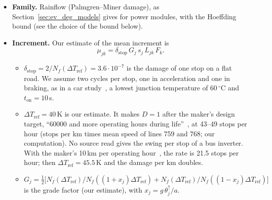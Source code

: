 \documentclass[11pt,a4paper]{article}
\theoremstyle{plain}
\theoremstyle{definition}
\theoremstyle{remark}
\begin{document}
\begin{itemize}
    With a Weibull shape~$k$ of module life, a module fails before $D$ reaches~$\tau$ with probability $1 - \exp(-\ln(1/0.85)\,\tau^k)$.
    Setting this probability to 1\% gives (our derivation)
    \begin{equation}\label{eq:cs_inv_tau}
      \tau = \bigl(\ln 0.99/\ln 0.85\bigr)^{1/k},
    \end{equation}
    that is $\tau = 0.573$ for $k = 5$ and $\tau = 0.814$ for $k = 13.5$.
    Shapes from 13.5 to 24 fit one industrial module at a swing of 81\,K (our computation from~\cite[Table~IV]{Choi2017}); $k \approx 4$--$5$ is our reading of the spread of the maker's tests at 30\,K~\cite[Fig.~3]{Wintrich2024}.
    This is the $\varepsilon$-splitting of Remark~\ref{rem:miner_dichotomy} with $\delta = 0.01$: the total failure probability is at most $0.01 + \varepsilon$ (union bound).
  \item \textbf{Family.}
    Rainflow (Palmgren--Miner damage), as Section~\ref{sec:ev_deg_models} gives for power modules, with the Hoeffding bound (see the choice of the bound below).
  \item \textbf{Increment.}
    Our estimate of the mean increment is
    \begin{equation}\label{eq:cs_inverter}
      \mu_{jk} = \delta_{\mathrm{stop}}\, G_j\, s_j\, L_{jk}\, F_k .
    \end{equation}
    \begin{itemize}
      \item $\delta_{\mathrm{stop}} = 2/N_f(\Delta T_{\mathrm{ref}}) = 3.6 \cdot 10^{-7}$ is the damage of one stop on a flat road.
        We assume two cycles per stop, one in acceleration and one in braking, as in a car study~\cite[Fig.~19]{Lu2023}, a lowest junction temperature of 60\,$^\circ$C and $t_{\mathrm{on}} = 10$\,s.
      \item $\Delta T_{\mathrm{ref}} = 40$\,K is our estimate.
        It makes $D = 1$ after the maker's design target, ``60000 and more operating hours during life''~\cite{Backhaus2019}, at 43--49 stops per hour (stops per km times mean speed of lines 759 and 768; our computation).
        No source read gives the swing per stop of a bus inverter.
        With the maker's 10\,km per operating hour~\cite{Backhaus2019}, the rate is 21.5 stops per hour; then $\Delta T_{\mathrm{ref}} = 45.5$\,K and the damage per km doubles.
      \item $G_j = \tfrac12\bigl[N_f(\Delta T_{\mathrm{ref}})/N_f((1+x_j)\Delta T_{\mathrm{ref}}) + N_f(\Delta T_{\mathrm{ref}})/N_f((1-x_j)\Delta T_{\mathrm{ref}})\bigr]$ is the grade factor (our estimate), with $x_j = g\,\theta^{\uparrow}_j/a$.

\end{itemize}
\end{itemize}
\end{document}
